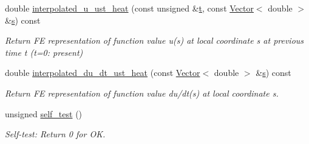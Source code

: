 \begin{DoxyCompactItemize}
double \hyperlink{classoomph_1_1UnsteadyHeatEquations_a267490c49a2e6556ac74e37220882ad3}{interpolated\+\_\+u\+\_\+ust\+\_\+heat} (const unsigned \&\hyperlink{cfortran_8h_af6f0bd3dc13317f895c91323c25c2b8f}{t}, const \hyperlink{classoomph_1_1Vector}{Vector}$<$ double $>$ \&\hyperlink{cfortran_8h_ab7123126e4885ef647dd9c6e3807a21c}{s}) const
\begin{DoxyCompactList}\small\item\em Return FE representation of function value u(s) at local coordinate s at previous time t (t=0\+: present) \end{DoxyCompactList}\item 
double \hyperlink{classoomph_1_1UnsteadyHeatEquations_ac113fbfb338fa3d20b937035ba8f6fd3}{interpolated\+\_\+du\+\_\+dt\+\_\+ust\+\_\+heat} (const \hyperlink{classoomph_1_1Vector}{Vector}$<$ double $>$ \&\hyperlink{cfortran_8h_ab7123126e4885ef647dd9c6e3807a21c}{s}) const
\begin{DoxyCompactList}\small\item\em Return FE representation of function value du/dt(s) at local coordinate s. \end{DoxyCompactList}\item 
unsigned \hyperlink{classoomph_1_1UnsteadyHeatEquations_a6f16f48984d7edf9e67818d9e4bbcf13}{self\+\_\+test} ()
\begin{DoxyCompactList}\small\item\em Self-\/test\+: Return 0 for OK. \end{DoxyCompactList}\end{DoxyCompactItemize}
